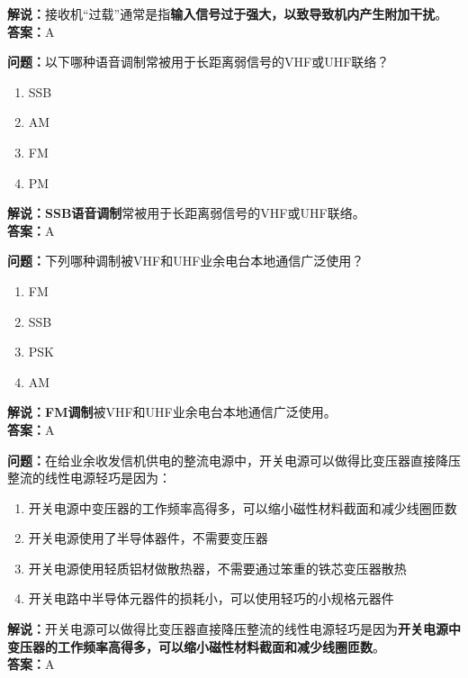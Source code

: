 \textbf{解说：}接收机“过载”通常是指\textbf{输入信号过于强大，以致导致机内产生附加干扰}。\\\textbf{答案：}A%



\textbf{问题：}以下哪种语音调制常被用于长距离弱信号的VHF或UHF联络？

\begin{enumerate}[label=\Alph*), leftmargin=1cm]
	\item SSB
	\item AM
	\item FM
	\item PM
\end{enumerate}

\textbf{解说：}\textbf{SSB语音调制}常被用于长距离弱信号的VHF或UHF联络。\\\textbf{答案：}A%



\textbf{问题：}下列哪种调制被VHF和UHF业余电台本地通信广泛使用？

\begin{enumerate}[label=\Alph*), leftmargin=1cm]
	\item FM
	\item SSB
	\item PSK
	\item AM
\end{enumerate}

\textbf{解说：}\textbf{FM调制}被VHF和UHF业余电台本地通信广泛使用。\\\textbf{答案：}A%



\textbf{问题：}在给业余收发信机供电的整流电源中，开关电源可以做得比变压器直接降压整流的线性电源轻巧是因为：

\begin{enumerate}[label=\Alph*), leftmargin=1cm]
	\item 开关电源中变压器的工作频率高得多，可以缩小磁性材料截面和减少线圈匝数
	\item 开关电源使用了半导体器件，不需要变压器
	\item 开关电源使用轻质铝材做散热器，不需要通过笨重的铁芯变压器散热
	\item 开关电路中半导体元器件的损耗小，可以使用轻巧的小规格元器件
\end{enumerate}

\textbf{解说：}开关电源可以做得比变压器直接降压整流的线性电源轻巧是因为\textbf{开关电源中变压器的工作频率高得多，可以缩小磁性材料截面和减少线圈匝数}。\\\textbf{答案：}A%



